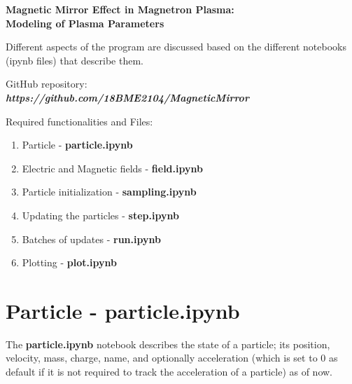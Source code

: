 \documentclass[12pt]{article}
\begin{document}
	
	{\selectfont 
		\begin{center}
			\Large{\textbf{Magnetic Mirror Effect in Magnetron Plasma:}} \\
			\Large{\textbf{Modeling of Plasma Parameters}} \\
		\end{center}
		
		Different aspects of the program are discussed based on the different notebooks (ipynb files) that describe them.
		
		\begin{center}
			\begin{tcolorbox}[width=15cm]
				GitHub repository:
				\vspace{0.2cm} 
			\phantom{a} \\
		\phantom{push this repository}
	\textbf{\textit{https://github.com/18BME2104/MagneticMirror}} \\
\phantom{a}
			\end{tcolorbox}
		\end{center}
		
		\begin{center}
			\begin{tcolorbox}[width=12cm]
				Required functionalities and Files:
				\vspace{0.2cm} 
				\begin{enumerate}
					\item Particle - \textbf{particle.ipynb}
					\item Electric and Magnetic fields - \textbf{field.ipynb}
					\item Particle initialization - \textbf{sampling.ipynb}
					\item Updating the particles - \textbf{step.ipynb}
					\item Batches of updates - \textbf{run.ipynb}
					\item Plotting - \textbf{plot.ipynb}
				\end{enumerate}
			\end{tcolorbox}
		\end{center}
		
		\section{Particle - particle.ipynb}
		The \textbf{particle.ipynb} notebook describes the state of a particle; its position, velocity, mass, charge, name, and optionally acceleration (which is set to 0 as default if it is not required to track the acceleration of a particle) as of now. \\
		
}
\end{document}
